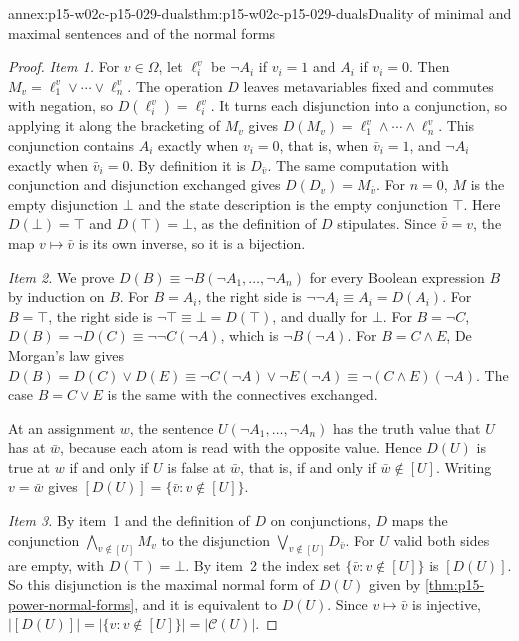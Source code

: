 \begin{annexitem}{annex:p15-w02c-p15-029-duals}{thm:p15-w02c-p15-029-duals}{Duality of minimal and maximal sentences and of the normal forms}
\begin{proof}
\emph{Item 1.} For \(v\in\Omega\), let \(\ell_i^v\) be \(\neg A_i\) if
\(v_i=1\) and \(A_i\) if \(v_i=0\). Then \(M_v=\ell_1^v\lor\cdots\lor
\ell_n^v\). The operation \(D\) leaves metavariables fixed and commutes
with negation, so \(D(\ell_i^v)=\ell_i^v\). It turns each disjunction
into a conjunction, so applying it along the bracketing of \(M_v\) gives
\(D(M_v)=\ell_1^v\land\cdots\land\ell_n^v\). This conjunction contains
\(A_i\) exactly when \(v_i=0\), that is, when \(\bar v_i=1\), and
\(\neg A_i\) exactly when \(\bar v_i=0\). By definition it is
\(D_{\bar v}\). The same computation with conjunction and disjunction
exchanged gives \(D(D_v)=M_{\bar v}\). For \(n=0\), \(M\) is the empty
disjunction \(\bot\) and the state description is the empty conjunction
\(\top\). Here \(D(\bot)=\top\) and \(D(\top)=\bot\), as the definition
of \(D\) stipulates. Since \(\bar{\bar v}=v\), the map \(v\mapsto\bar v\)
is its own inverse, so it is a bijection.

\emph{Item 2.} We prove \(D(B)\equiv\neg B(\neg A_1,\ldots,\neg A_n)\) for
every Boolean expression \(B\) by induction on \(B\). For \(B=A_i\), the
right side is \(\neg\neg A_i\equiv A_i=D(A_i)\). For \(B=\top\), the
right side is \(\neg\top\equiv\bot=D(\top)\), and dually for \(\bot\).
For \(B=\neg C\),
\(D(B)=\neg D(C)\equiv\neg\neg C(\neg A)\), which is
\(\neg B(\neg A)\). For \(B=C\land E\), De Morgan's law gives
\(D(B)=D(C)\lor D(E)\equiv\neg C(\neg A)\lor\neg E(\neg A)
\equiv\neg(C\land E)(\neg A)\). The case \(B=C\lor E\) is the same with
the connectives exchanged.

At an assignment \(w\), the sentence \(U(\neg A_1,\ldots,\neg A_n)\) has
the truth value that \(U\) has at \(\bar w\), because each atom is read
with the opposite value. Hence \(D(U)\) is true at \(w\) if and only if
\(U\) is false at \(\bar w\), that is, if and only if \(\bar w\notin[U]\).
Writing \(v=\bar w\) gives
\([D(U)]=\{\bar v:v\notin[U]\}\).

\emph{Item 3.} By item~1 and the definition of \(D\) on conjunctions,
\(D\) maps the conjunction \(\bigwedge_{v\notin[U]}M_v\) to the
disjunction \(\bigvee_{v\notin[U]}D_{\bar v}\). For \(U\) valid both
sides are empty, with \(D(\top)=\bot\). By item~2 the index set
\(\{\bar v:v\notin[U]\}\) is \([D(U)]\). So this disjunction is the
maximal normal form of \(D(U)\) given by
\cref{thm:p15-power-normal-forms}, and it is equivalent to \(D(U)\).
Since \(v\mapsto\bar v\) is injective,
\(|[D(U)]|=|\{v:v\notin[U]\}|=|\mathcal C(U)|\).


\end{proof}
\end{annexitem}
